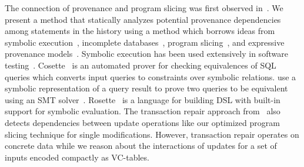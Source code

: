 The connection of provenance and program slicing was %
first observed in~\cite{cheney07}.
%
%
%
We present a method that statically analyzes potential provenance dependencies among statements in the history using a method which borrows ideas from symbolic execution~\cite{bucur14,K76,luckow14}, incomplete databases~\cite{AG85, IL84a, pip10, lenses15}, program slicing~\cite{W81}, and expressive provenance models~\cite{AD11d}.
Symbolic execution has been used extensively in software testing~\cite{cadar13}.
Cosette~\cite{chu2017} is an automated prover for checking equivalences of SQL queries which converts input queries to constraints over symbolic relations.
\cite{zhou-19-autvqequssm} use a symbolic representation of a query result to prove two queries to be equivalent using an SMT solver~\cite{moura-11-smt}.
Rosette~\cite{torlak2014} is a
language for building DSL with built-in support for symbolic evaluation.
The transaction repair approach from~\cite{dashti17} also detects dependencies between update operations like our optimized program slicing technique for single modifications. However, transaction repair operates on concrete data while we reason about the interactions of updates for a set of inputs encoded compactly as VC-tables.

%
%
%
%
%
%
%

%
%
%
%
%
%
%
%
%
%
%
%
%
%
%
%
%
%
%
%
%


%

%
%
%
%
%
%
%
%
%
%
%
%
%
%

